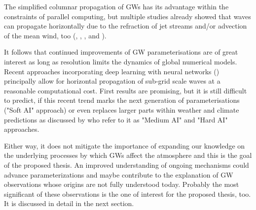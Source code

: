 The simplified columnar propagation of GWs has its advantage within the constraints of parallel computing, but multiple studies already showed that waves can propagate horizontally due to the refraction of jet streams and/or advection of the mean wind, too (\cite{dunkerton_inertiagravity_1984}, \cite{preusse_space-based_2002}, \cite{sato_origins_2009}, \cite{sato_gravity_2012} and \cite{ehard_horizontal_2017}). %

It follows that continued improvements of GW parameterisations are of great interest as long as resolution limits the dynamics of global numerical models. Recent approaches incorporating deep learning with neural networks (\cite{matsuoka_application_2020}) principally allow for horizontal propagation of sub-grid scale waves at a reasonable computational cost. First results are promising, but it is still difficult to predict, if this recent trend marks the next generation of parameterisations ("Soft AI" approach) or even replaces larger parts within weather and climate predictions as discussed by \textcite{chantry_opportunities_2021} who refer to it as "Medium AI" and "Hard AI" approaches.

Either way, it does not mitigate the importance of expanding our knowledge on the underlying processes by which GWs affect the atmosphere and this is the goal of the proposed thesis. An improved understanding of ongoing mechanisms could advance parameterizations and maybe contribute to the explanation of GW observations whose origins are not fully understood today. Probably the most significant of these observations is the one of interest for the proposed thesis, too. It is discussed in detail in the next section.





